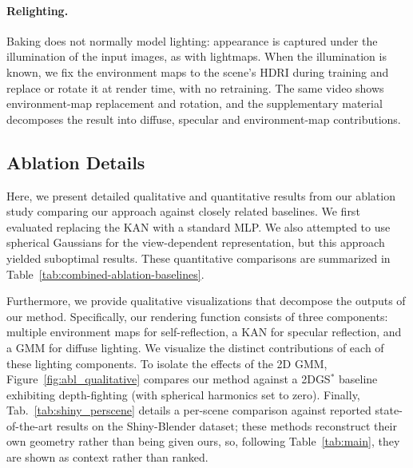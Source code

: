 \begin{addblock}
\paragraph{Relighting.} Baking does not normally model lighting: appearance is captured under the
illumination of the input images, as with lightmaps. When the illumination is known, we fix the
environment maps to the scene's HDRI during training and replace or rotate it at render time, with
no retraining. The same video shows environment-map replacement and rotation, and the
supplementary material decomposes the result into diffuse, specular and environment-map
contributions.
\end{addblock}

\subsection{Ablation Details}

Here, we present detailed qualitative and quantitative results from our ablation study comparing our approach against closely related baselines. We first evaluated replacing the KAN with a standard MLP.  We also attempted to use spherical Gaussians for the view-dependent representation, but this approach yielded suboptimal results. These quantitative comparisons are summarized in Table~\ref{tab:combined-ablation-baselines}.

Furthermore, we provide qualitative visualizations that decompose the outputs of our method. Specifically, our rendering function consists of three components: multiple environment maps for self-reflection, a KAN for specular reflection, and a GMM for diffuse lighting. We visualize the distinct contributions of each of these lighting components. To isolate the effects of the 2D GMM, Figure~\ref{fig:abl_qualitative} compares our method against a 2DGS$^{*}$ baseline exhibiting depth-fighting (with spherical harmonics set to zero). Finally, Tab.~\ref{tab:shiny_perscene} details a per-scene comparison against reported state-of-the-art results on the Shiny-Blender dataset; these methods reconstruct their own geometry rather than being given ours, so, following Table~\ref{tab:main}, they are shown as context rather than ranked.

